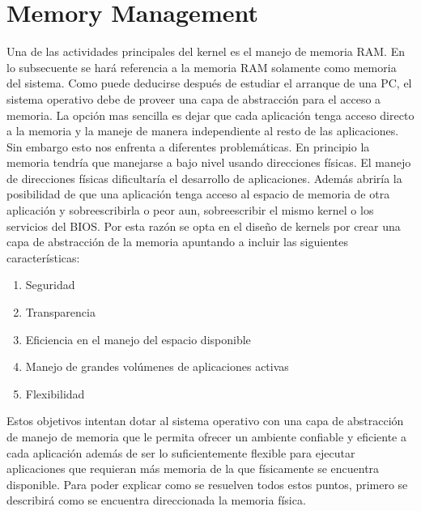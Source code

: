 \section{Memory Management} Una de las actividades principales del kernel es el
manejo de memoria RAM. En lo subsecuente se hará referencia a la memoria RAM
solamente como memoria del sistema. Como puede deducirse después de estudiar el
arranque de una PC, el sistema operativo debe de proveer una capa de
abstracción para el acceso a memoria. La opción mas sencilla es dejar que cada
aplicación tenga acceso directo a la memoria y la maneje de manera
independiente al resto de las aplicaciones. Sin embargo esto nos enfrenta a
diferentes problemáticas. En principio la memoria tendría que manejarse a bajo
nivel usando direcciones físicas. El manejo de direcciones físicas dificultaría
el desarrollo de aplicaciones. Además abriría la posibilidad de que una
aplicación tenga acceso al espacio de memoria de otra aplicación y
sobreescribirla o peor aun, sobreescribir el mismo kernel o los servicios del
BIOS.  Por esta razón se opta en el diseño de kernels por crear una capa de
abstracción de la memoria apuntando a incluir las siguientes características:
\begin{enumerate}
\item Seguridad
\item Transparencia
\item Eficiencia en el manejo del espacio disponible
\item Manejo de grandes volúmenes de aplicaciones activas
\item Flexibilidad
\end{enumerate} Estos objetivos intentan dotar al sistema operativo con una
capa de abstracción de manejo de memoria que le permita ofrecer un ambiente
confiable y eficiente a cada aplicación además de ser lo suficientemente
flexible para ejecutar aplicaciones que requieran más memoria de la que
físicamente se encuentra disponible. Para poder explicar como se resuelven
todos estos puntos, primero se describirá como se encuentra direccionada la
memoria física.

